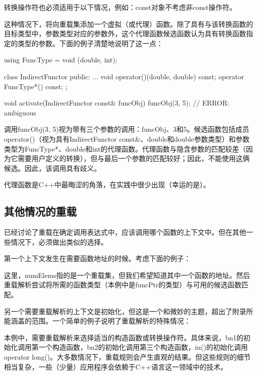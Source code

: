 \begin{notice}
转换操作符也必须适用于以下情况，例如：const对象不考虑非const操作符。
\end{notice}

这种情况下，将向重载集添加一个虚拟（或代理）函数。除了具有与该转换函数的目标类型中，参数类型对应的参数外，这个代理函数候选函数认为具有转换函数指定的类型的参数。下面的例子清楚地说明了这一点：

\begin{cpp}
using FuncType = void (double, int);

class IndirectFunctor {
	public:
	...
	void operator()(double, double) const;
	operator FuncType*() const;
};

void activate(IndirectFunctor const& funcObj)
{
	funcObj(3, 5); // ERROR: ambiguous
}
\end{cpp}

调用funcObj(3, 5)视为带有三个参数的调用：funcObj、3和5。候选函数包括成员operator()（视为具有IndirectFunctor const\&、double和double参数类型）和参数类型为FuncType*、double和int的代理函数。代理函数与隐含参数的匹配较差（因为它需要用户定义的转换），但与最后一个参数的匹配较好；因此，不能使用这俩候选。因此，该调用具有歧义。

代理函数是C++中最晦涩的角落，在实践中很少出现（幸运的是）。

\subsection{其他情况的重载}

已经讨论了重载在确定调用表达式中，应该调用哪个函数的上下文中。但在其他一些情况下，必须做出类似的选择。

第一个上下文发生在需要函数地址的时候。考虑下面的例子：


这里，numElems指的是一个重载集，但我们希望知道其中一个函数的地址。然后重载解析尝试将所需的函数类型（本例中是funcPtr的类型）与可用的候选函数匹配。

另一个需要重载解析的上下文是初始化，但这是一个和微妙的主题，超出了附录所能涵盖的范围。一个简单的例子说明了重载解析的特殊情况：


本例中，需要重载解析来选择适当的构造函数或转换操作符。具体来说，bn1的初始化调用第一个构造函数，bn2的初始化调用第三个构造函数，in()的初始化调用operator long()。大多数情况下，重载规则会产生直观的结果。但这些规则的细节相当复杂，一些（少量）应用程序会依赖于C++语言这一领域中的技术。













